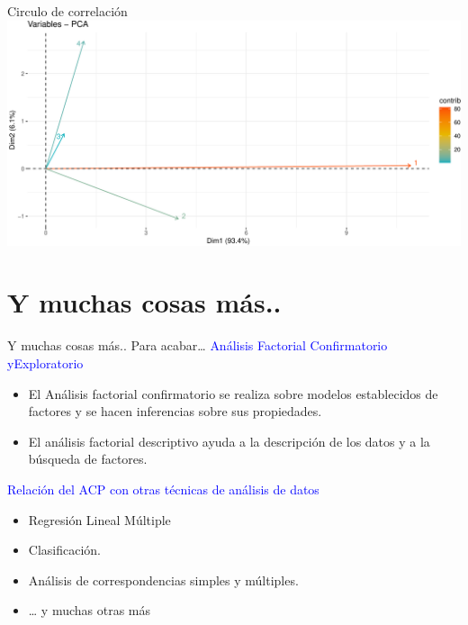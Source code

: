 \documentclass[
  ignorenonframetext,
]{beamer}
\providecommand{\tightlist}{%
  \setlength{\itemsep}{0pt}\setlength{\parskip}{0pt}}
\newcommand\blue[1]{\textcolor{blue}{#1}}
\begin{document}
\begin{frame}{Circulo de correlación}
\protect\hypertarget{circulo-de-correlaciuxf3n-2}{}
\includegraphics{AnalisisComponentesPrincipales_fusion_files/figure-beamer/biplor-1.pdf}
\end{frame}

\hypertarget{y-muchas-cosas-muxe1s..}{%
\section{Y muchas cosas más..}\label{y-muchas-cosas-muxe1s..}}

\begin{frame}{Y muchas cosas más..}
\protect\hypertarget{y-muchas-cosas-muxe1s..-1}{}
Para acabar\ldots{}
\blue{Análisis Factorial Confirmatorio yExploratorio}

\begin{itemize}
\item
  El Análisis factorial confirmatorio se realiza sobre modelos
  establecidos de factores y se hacen inferencias sobre sus propiedades.
\item
  El análisis factorial descriptivo ayuda a la descripción de los datos
  y a la búsqueda de factores.
\end{itemize}

\blue{Relación del ACP con otras técnicas de análisis de datos}

\begin{itemize}
\tightlist
\item
  Regresión Lineal Múltiple
\item
  Clasificación.
\item
  Análisis de correspondencias simples y múltiples.
\item
  \ldots{} y muchas otras más
\end{itemize}
\end{frame}
\end{document}
